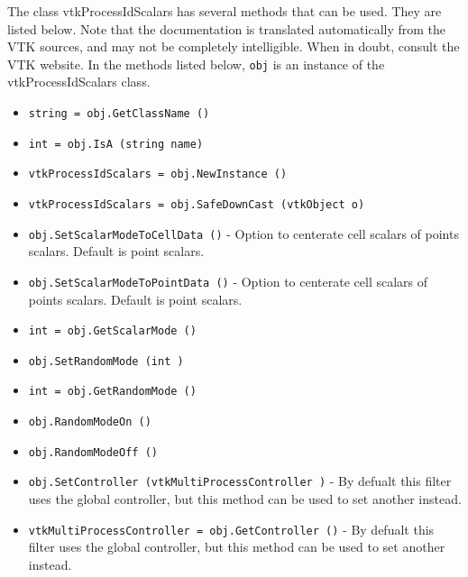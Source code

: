 The class vtkProcessIdScalars has several methods that can be used.
  They are listed below.
Note that the documentation is translated automatically from the VTK sources,
and may not be completely intelligible.  When in doubt, consult the VTK website.
In the methods listed below, \verb|obj| is an instance of the vtkProcessIdScalars class.
\begin{itemize}
\item  \verb|string = obj.GetClassName ()|

\item  \verb|int = obj.IsA (string name)|

\item  \verb|vtkProcessIdScalars = obj.NewInstance ()|

\item  \verb|vtkProcessIdScalars = obj.SafeDownCast (vtkObject o)|

\item  \verb|obj.SetScalarModeToCellData ()| -  Option to centerate cell scalars of points scalars.  Default is point
 scalars.

\item  \verb|obj.SetScalarModeToPointData ()| -  Option to centerate cell scalars of points scalars.  Default is point
 scalars.

\item  \verb|int = obj.GetScalarMode ()|

\item  \verb|obj.SetRandomMode (int )|

\item  \verb|int = obj.GetRandomMode ()|

\item  \verb|obj.RandomModeOn ()|

\item  \verb|obj.RandomModeOff ()|

\item  \verb|obj.SetController (vtkMultiProcessController )| -  By defualt this filter uses the global controller,
 but this method can be used to set another instead.

\item  \verb|vtkMultiProcessController = obj.GetController ()| -  By defualt this filter uses the global controller,
 but this method can be used to set another instead.

\end{itemize}
